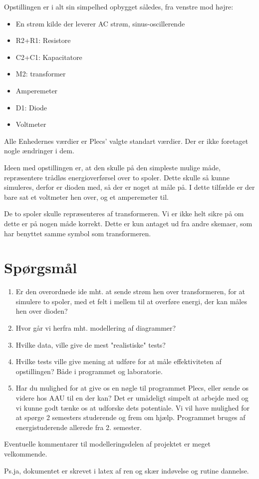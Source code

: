 \documentclass[a4paper,11pt]{memoir}
\begin{document}
Opstillingen er i alt sin simpelhed opbygget således, fra venstre mod højre:

\begin{itemize}
\item En strøm kilde der leverer AC strøm, sinus-oscillerende
\item R2+R1: Resistore
\item C2+C1: Kapacitatore
\item M2: transformer
\item Amperemeter
\item D1: Diode
\item Voltmeter
\end{itemize}

Alle Enhedernes værdier er Plecs' valgte standart værdier. Der er ikke foretaget nogle ændringer i dem.

Ideen med opstillingen er, at den skulle på den simpleste mulige måde, repræsentere trådløs energioverførsel over to spoler. Dette skulle så kunne simuleres, derfor er dioden med, så der er noget at måle på. I dette tilfælde er der bare sat et voltmeter hen over, og et amperemeter til.

De to spoler skulle repræsenteres af transformeren. Vi er ikke helt sikre på om dette er på nogen måde korrekt. Dette er kun antaget ud fra andre skemaer, som har benyttet samme symbol som transformeren.

\section{Spørgsmål}
\begin{enumerate}
\item Er den overordnede ide mht. at sende strøm hen over transformeren, for at simulere to spoler, med et felt i mellem til at overføre energi, der kan måles hen over dioden?
\item Hvor går vi herfra mht. modellering af diagrammer?
\item Hvilke data, ville give de mest "realistiske" tests?
\item Hvilke tests ville give mening at udføre for at måle effektiviteten af opstillingen? Både i programmet og laboratorie.
\item Har du mulighed for at give os en nøgle til programmet Plecs, eller sende os videre hos AAU til en der kan? Det er umådeligt simpelt at arbejde med og vi kunne godt tænke os at udforske dets potentiale. Vi vil have mulighed for at spørge 2 semesters studerende og frem om hjælp. Programmet bruges af energistuderende allerede fra 2. semester.
\end{enumerate}
Eventuelle kommentarer til modelleringsdelen af projektet er meget velkommende.

Ps.ja, dokumentet er skrevet i latex af ren og skær indøvelse og rutine dannelse.
\end{document}
